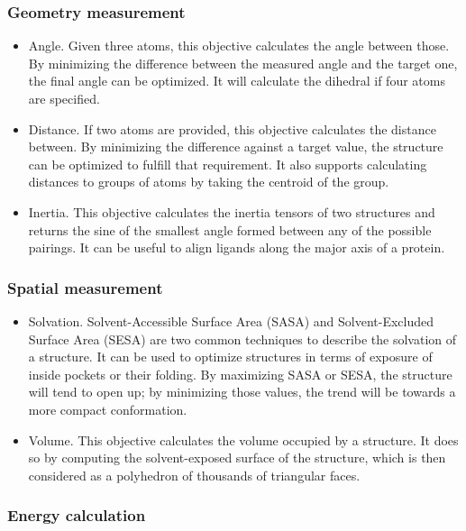 \subsubsection{Geometry measurement}
\begin{itemize}
	\item Angle. Given three atoms, this objective calculates the angle between those. By minimizing the difference between the measured angle and the target one, the final angle can be optimized. It will calculate the dihedral if four atoms are specified.

	\item Distance. If two atoms are provided, this objective calculates the distance between. By minimizing the difference against a target value, the structure can be optimized to fulfill that requirement. It also supports calculating distances to groups of atoms by taking the centroid of the group.

	\item Inertia. This objective calculates the inertia tensors of two structures and returns the sine of the smallest angle formed between any of the possible pairings. It can be useful to align ligands along the major axis of a protein.


\end{itemize}\subsubsection{Spatial measurement}
\begin{itemize}
	\item Solvation. Solvent-Accessible Surface Area (SASA) and Solvent-Excluded Surface Area (SESA) are two common techniques to describe the solvation of a structure. It can be used to optimize structures in terms of exposure of inside pockets or their folding. By maximizing SASA or SESA, the structure will tend to open up; by minimizing those values, the trend will be towards a more compact conformation.

	\item Volume. This objective calculates the volume occupied by a structure. It does so by computing the solvent-exposed surface of the structure, which is then considered as a polyhedron of thousands of triangular faces.


\end{itemize}\subsubsection{Energy calculation}
